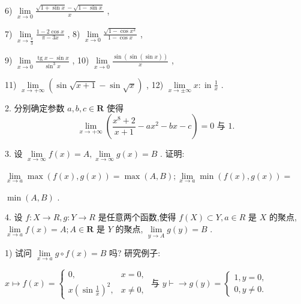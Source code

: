 6) $\mathop{\lim }\limits_{{x \rightarrow  0}}\frac{\sqrt{1 + \sin x} - \sqrt{1 - \sin x}}{x}$ ,

7) $\mathop{\lim }\limits_{{x \rightarrow  \frac{\pi }{3}}}\frac{1 - 2\cos x}{\pi  - {3x}}$ , 8) $\mathop{\lim }\limits_{{x \rightarrow  0}}\frac{\sqrt{1 - \cos {x}^{2}}}{1 - \cos x}$ ,

9) $\mathop{\lim }\limits_{{x \rightarrow  0}}\frac{\operatorname{tg}x - \sin x}{{\sin }^{3}x}$ , 10) $\mathop{\lim }\limits_{{x \rightarrow  0}}\frac{\sin \left( {\sin \left( {\sin x}\right) }\right) }{x}$ ,

11) $\mathop{\lim }\limits_{{x \rightarrow   + \infty }}\left( {\sin \sqrt{x + 1} - \sin \sqrt{x}}\right)$ , 12) $\mathop{\lim }\limits_{{x \rightarrow   \pm  \infty }}x : \operatorname{in}\frac{1}{x}$ .

2. 分别确定参数 $a,b,c \in  \mathbf{R}$ 使得
$$\mathop{\lim }\limits_{{x \rightarrow   + \infty }}\left( {\frac{{x}^{8} + 2}{x + 1} - a{x}^{2} - {bx} - c}\right)  = 0\text{ 与 }1.$$

3. 设 $\mathop{\lim }\limits_{{x \rightarrow  \infty }}f\left( x\right)  = A,\mathop{\lim }\limits_{{x \rightarrow  \infty }}g\left( x\right)  = B$ . 证明:

$\mathop{\lim }\limits_{{x \rightarrow  a}}\max \left( {f\left( x\right) ,g\left( x\right) }\right)  = \max \left( {A,B}\right) ;\mathop{\lim }\limits_{{x \rightarrow  a}}\min \left( {f\left( x\right) ,g\left( x\right) }\right)  =$

$\min \left( {A,B}\right)$ .

4. 设 $f : X \rightarrow  R,g : Y \rightarrow  R$ 是任意两个函数,使得 $f\left( X\right)  \subset  Y,a \in  R$ 是 $X$ 的聚点, $\mathop{\lim }\limits_{{x \rightarrow  a}}f\left( x\right)  = A;A \in  \mathbf{R}$ 是 $Y$ 的聚点, $\mathop{\lim }\limits_{{y \rightarrow  A}}g\left( y\right)  = B$ .

1) 试问 $\mathop{\lim }\limits_{{x \rightarrow  a}}g \circ  f\left( x\right)  = B$ 吗? 研究例子:

$x \mapsto  f\left( x\right)  = \left\{  {\begin{array}{ll} 0, & x = 0, \\  x{\left( \sin \frac{1}{x}\right) }^{2}, & x \neq  0, \end{array}\text{ 与 }y \vdash   \rightarrow  g\left( y\right)  = \left\{  \begin{array}{l} 1,y = 0, \\  0,y \neq  0. \end{array}\right. }\right.$

